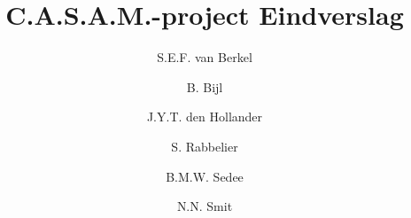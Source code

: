 \usepackage{url}

\newcommand{\casam}{C.A.S.A.M. }
\newcommand{\casamproject}{C.A.S.A.M.-pro\-ject }


\title{\casamproject Eindverslag}
\author{S.E.F. van Berkel \and B. Bijl \and J.Y.T. den Hollander \and S. Rabbelier \and B.M.W. Sedee \and N.N. Smit}



\begin{titlepage}

\maketitle

\thispagestyle{empty}

\end{titlepage}

\setcounter{page}{2}
\setcounter{tocdepth}{2}

\tableofcontents

\newpage



\tableofcontents



















\newpage







